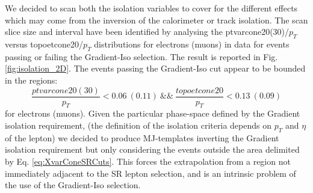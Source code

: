 We decided to scan both the isolation variables to cover for the different effects which may come from the inversion of the calorimeter or track isolation. 
The scan slice size and interval have been identified by analysing the ptvarcone20(30)/$p_T$ versus topoetcone20/$p_T$ distributions for electrons (muons) in data for events passing or failing the Gradient-Iso selection.
The result is reported in Fig.\ref{fig:isolation_2D}.
The events passing the Gradient-Iso cut appear to be bounded in the regions:
\begin{equation}
  \label{eq:XvarConeSRCuts}
  \frac{ptvarcone20(30)}{p_T} <0.06~(0.11)~\&\&~\frac{topoetcone20}{p_T} <0.13~(0.09)
\end{equation}
for electrons (muons).
Given the particular phase-space defined by the Gradient isolation requirement, (the definition of the isolation criteria depends on $p_T$ and $\eta$ of the lepton) we decided to produce MJ-templates inverting the Gradient isolation requirement but only considering the events outside the area delimited by Eq. \ref{eq:XvarConeSRCuts}. 
This forces the extrapolation from a region not immediately adjacent to the SR lepton selection, and is an intrinsic problem of the use of the Gradient-Iso selection.

